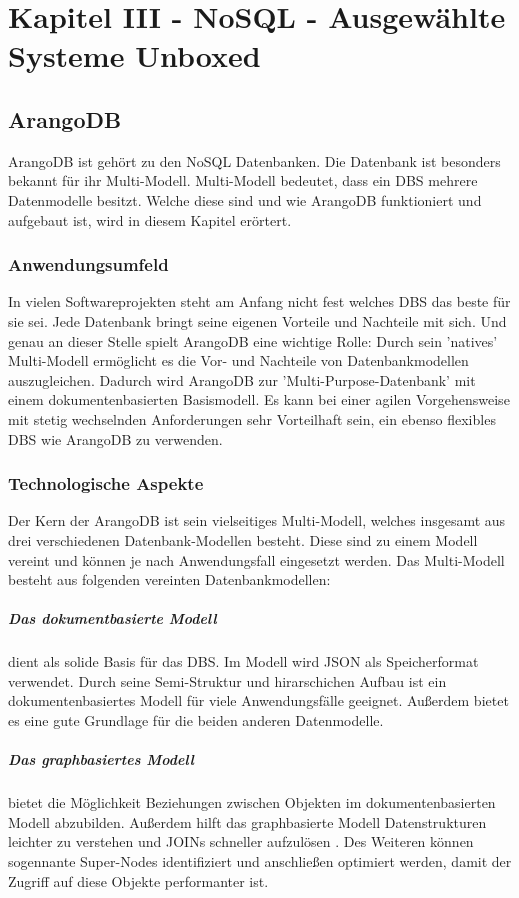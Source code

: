 \chapter{Kapitel III - NoSQL - Ausgewählte Systeme Unboxed}
\section{ArangoDB}
ArangoDB ist gehört zu den \ac{NoSQL} Datenbanken. Die Datenbank ist besonders bekannt für ihr Multi-Modell. Multi-Modell bedeutet, dass ein \ac{DBS} mehrere Datenmodelle besitzt. Welche diese sind und wie ArangoDB funktioniert und aufgebaut ist, wird in diesem Kapitel erörtert.
\subsection{Anwendungsumfeld}
In vielen Softwareprojekten steht am Anfang nicht fest welches \ac{DBS} das beste für sie sei. Jede Datenbank bringt seine eigenen Vorteile und Nachteile mit sich. Und genau an dieser Stelle spielt ArangoDB eine wichtige Rolle:
Durch sein ’natives’ Multi-Modell ermöglicht es die Vor- und Nachteile von Datenbankmodellen auszugleichen. Dadurch wird ArangoDB zur ’Multi-Purpose-Datenbank’ mit einem dokumentenbasierten Basismodell\cite{jaxenter01}. Es kann bei einer agilen Vorgehensweise mit stetig wechselnden Anforderungen sehr Vorteilhaft sein, ein ebenso flexibles DBS wie ArangoDB zu verwenden.

 \subsection{Technologische Aspekte}
Der Kern der ArangoDB ist sein vielseitiges Multi-Modell, welches insgesamt aus drei verschiedenen Datenbank-Modellen besteht. Diese sind zu einem Modell vereint und können je nach Anwendungsfall eingesetzt werden. Das Multi-Modell besteht aus folgenden  vereinten Datenbankmodellen:

\paragraph{Das dokumentbasierte Modell} dient als solide Basis für das \ac{DBS}. Im Modell wird \ac{JSON} als Speicherformat verwendet. Durch seine Semi-Struktur und hirarschichen Aufbau ist  ein dokumentenbasiertes Modell für viele Anwendungsfälle geeignet\cite{AWS_doc}.  Außerdem bietet es eine gute Grundlage für die beiden anderen Datenmodelle.

\paragraph{Das graphbasiertes Modell} bietet die Möglichkeit Beziehungen zwischen Objekten im dokumentenbasierten Modell abzubilden. Außerdem hilft das graphbasierte Modell Datenstrukturen leichter zu verstehen und JOINs schneller aufzulösen \cite{AWS_graph}. Des Weiteren können sogennante Super-Nodes identifiziert und anschließen optimiert werden, damit der Zugriff auf diese Objekte performanter ist.

